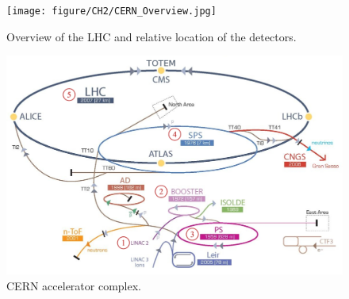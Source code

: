 \begin{figure}[h]
  \begin{center}
    \texttt{[image: figure/CH2/CERN\_Overview.jpg]}
  \end{center}
  \caption{\label{fig:LHC_overview}Overview of the LHC and relative location of the detectors.}
\end{figure}

\begin{figure}[t]
  \begin{center}
    \includegraphics[width=\textwidth]{figure/CH2/complex.png}
  \end{center}
  \caption{\label{fig:accelerator}CERN accelerator complex.}
\end{figure}
